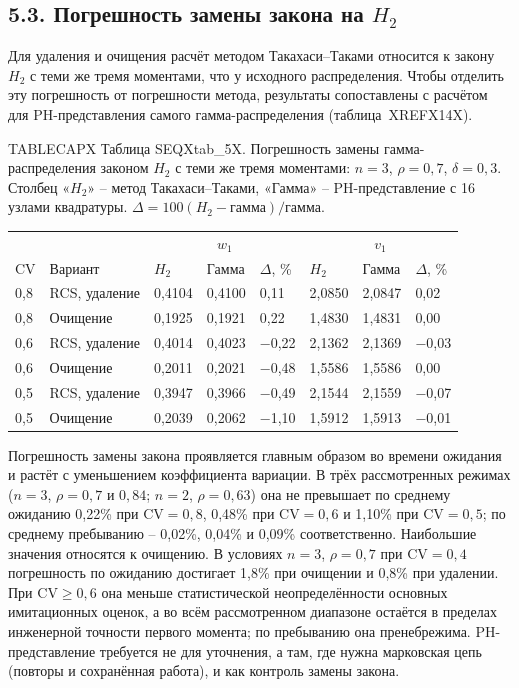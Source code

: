 \subsection*{5.3. Погрешность замены закона на \(H_2\)}
Для удаления и очищения расчёт методом Такахаси--Таками относится к закону \(H_2\) с теми же тремя моментами, что у исходного распределения. Чтобы отделить эту погрешность от погрешности метода, результаты сопоставлены с расчётом для PH-представления самого гамма-распределения (таблица~XREFX14X).

\noindent TABLECAPX Таблица SEQXtab_5X. Погрешность замены гамма-распределения законом \(H_2\) с теми же тремя моментами: \(n=3\), \(\rho=0{,}7\), \(\delta=0{,}3\). Столбец «\(H_2\)» -- метод Такахаси--Таками, «Гамма» -- PH-представление с 16 узлами квадратуры. \(\Delta=100(H_2-\text{гамма})/\text{гамма}\).\par

\setlength{\tabcolsep}{3pt}
\begin{tabular}{p{1.0cm}p{3.2cm}p{1.6cm}p{1.6cm}p{1.3cm}p{1.6cm}p{1.6cm}p{1.3cm}}
\toprule
 & & \multicolumn{3}{c}{$w_1$} & \multicolumn{3}{c}{$v_1$} \\
$\mathrm{CV}$ & Вариант & $H_2$ & Гамма & $\Delta$, \% & $H_2$ & Гамма & $\Delta$, \% \\
\midrule
0,8 & RCS, удаление & 0,4104 & 0,4100 & 0,11 & 2,0850 & 2,0847 & 0,02 \\
0,8 & Очищение & 0,1925 & 0,1921 & 0,22 & 1,4830 & 1,4831 & 0,00 \\
0,6 & RCS, удаление & 0,4014 & 0,4023 & −0,22 & 2,1362 & 2,1369 & −0,03 \\
0,6 & Очищение & 0,2011 & 0,2021 & −0,48 & 1,5586 & 1,5586 & 0,00 \\
0,5 & RCS, удаление & 0,3947 & 0,3966 & −0,49 & 2,1544 & 2,1559 & −0,07 \\
0,5 & Очищение & 0,2039 & 0,2062 & −1,10 & 1,5912 & 1,5913 & −0,01 \\
\bottomrule
\end{tabular}




Погрешность замены закона проявляется главным образом во времени ожидания и растёт с уменьшением коэффициента вариации. В трёх рассмотренных режимах (\(n=3\), \(\rho=0{,}7\) и \(0{,}84\); \(n=2\), \(\rho=0{,}63\)) она не превышает по среднему ожиданию 0,22\% при \(\mathrm{CV}=0{,}8\), 0,48\% при \(\mathrm{CV}=0{,}6\) и 1,10\% при \(\mathrm{CV}=0{,}5\); по среднему пребыванию -- 0,02\%, 0,04\% и 0,09\% соответственно. Наибольшие значения относятся к очищению. В условиях \(n=3\), \(\rho=0{,}7\) при \(\mathrm{CV}=0{,}4\) погрешность по ожиданию достигает 1,8\% при очищении и 0,8\% при удалении. При \(\mathrm{CV}\ge0{,}6\) она меньше статистической неопределённости основных имитационных оценок, а во всём рассмотренном диапазоне остаётся в пределах инженерной точности первого момента; по пребыванию она пренебрежима. PH-представление требуется не для уточнения, а там, где нужна марковская цепь (повторы и сохранённая работа), и как контроль замены закона.

